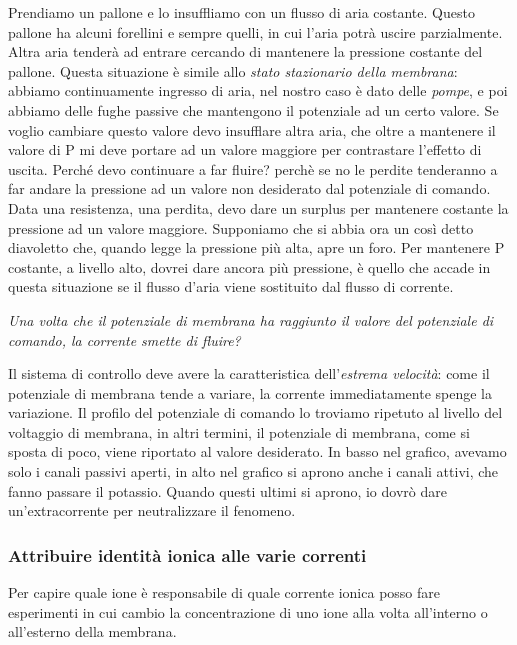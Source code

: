 \documentclass[a4paper,12pt]{article}
\begin{document}
Prendiamo un pallone e lo insuffliamo con un flusso di aria costante. Questo pallone ha alcuni forellini e sempre quelli, in cui l'aria potrà uscire parzialmente. Altra aria tenderà ad entrare cercando di mantenere la pressione costante del pallone. Questa situazione è simile allo \emph{stato stazionario della membrana}: abbiamo continuamente ingresso di aria, nel nostro caso è dato delle \emph{pompe}, e poi abbiamo delle fughe passive che mantengono il potenziale ad un certo valore. Se voglio cambiare questo valore devo insufflare altra aria, che oltre a mantenere il valore di P mi deve portare ad un valore maggiore per contrastare l’effetto di uscita. Perché devo continuare a far fluire? perchè se no le perdite tenderanno a far andare la pressione ad un valore non desiderato dal potenziale di comando.
Data una resistenza, una perdita, devo dare un surplus per mantenere costante la pressione ad un valore maggiore.
Supponiamo che si abbia ora un così detto diavoletto che, quando legge la pressione più alta, apre un foro. Per mantenere P costante, a livello alto, dovrei dare ancora più pressione, è quello che accade in questa situazione se il flusso d’aria viene sostituito dal flusso di corrente. 

\emph{Una volta che il potenziale di membrana ha raggiunto il valore del potenziale di comando, la corrente smette di fluire?}
 
Il sistema di controllo deve avere la caratteristica dell’\emph{estrema velocità}: come il potenziale di membrana tende a variare, la corrente immediatamente spenge la variazione. 
Il profilo del potenziale di comando lo troviamo ripetuto al livello del voltaggio di membrana, in altri termini, il potenziale di membrana, come si sposta di poco, viene riportato al valore desiderato. 
In basso nel grafico, avevamo solo i canali passivi aperti, in alto nel grafico si aprono anche i canali attivi, che fanno passare il potassio. Quando questi ultimi si aprono, io dovrò dare un’extracorrente per neutralizzare il fenomeno. 

\subsubsection{Attribuire identità ionica alle varie correnti}

Per capire quale ione è responsabile di quale corrente ionica posso fare esperimenti in cui cambio la concentrazione di uno ione alla volta all'interno o all'esterno della membrana.
 
\end{document}
